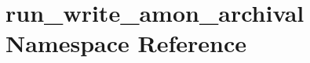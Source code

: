 \hypertarget{namespacerun__write__amon__archival}{\section{run\-\_\-write\-\_\-amon\-\_\-archival Namespace Reference}
\label{namespacerun__write__amon__archival}
}

